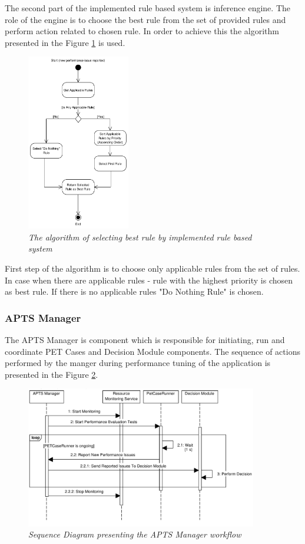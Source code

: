 \documentclass[12pt,a4paper]{article}
\begin{document}
The second part of the implemented rule based system is inference engine. The role of the engine is to choose the best rule from the set of provided rules and perform action related to chosen rule. In order to achieve this the algorithm presented in the Figure \ref{dmalgorithm} is used. 

\begin{figure}[!htb]
\centering
\includegraphics[width=0.4\textwidth]{DecisionModuleActivityDiagram}
\caption{\textit{The algorithm of selecting best rule by implemented rule based system}} \label{dmalgorithm}
\end{figure}

First step of the algorithm is to choose only applicable rules from the set of rules. In case when there are applicable rules - rule with the highest priority is chosen as best rule. If there is no applicable rules "Do Nothing Rule" is chosen.

\subsubsection{APTS Manager} \label{manager}

The APTS Manager is component which is responsible for initiating, run and coordinate PET Cases and Decision Module components. The sequence of actions performed by the manger during performance tuning of the application is presented in the Figure \ref{manager}.

\begin{figure}[!htb]
\centering
\includegraphics[width=0.9\textwidth]{ManagerSequenceDiagram}
\caption{\textit{Sequence Diagram presenting the APTS Manager workflow}} \label{manager}
\end{figure}
\end{document}
